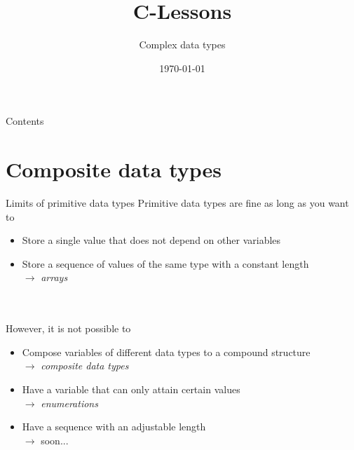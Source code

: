 


\title{C-Lessons}
\subtitle{Complex data types}
\date{\today}

\usetikzlibrary{tikzmark}



\maketitle

\begin{frame}{Contents}
	\tableofcontents
\end{frame}

\section{Composite data types}

\begin{frame}{Limits of primitive data types}
	Primitive data types are fine as long as you want to
	\begin{itemize}
		\item Store a single value that does not depend on other variables
		\item Store a sequence of values of the same type with a constant length \\
		$\rightarrow$ \textit{arrays}
	\end{itemize} \ \\ \ \\
	However, it is not possible to
	\begin{itemize}
		\item Compose variables of different data types to a compound structure \\
		$\rightarrow$ \textit{composite data types}
		\item Have a variable that can only attain certain values \\
		$\rightarrow$ \textit{enumerations}
		\item Have a sequence with an adjustable length \\
		$\rightarrow$ soon...
	\end{itemize}
\end{frame}


